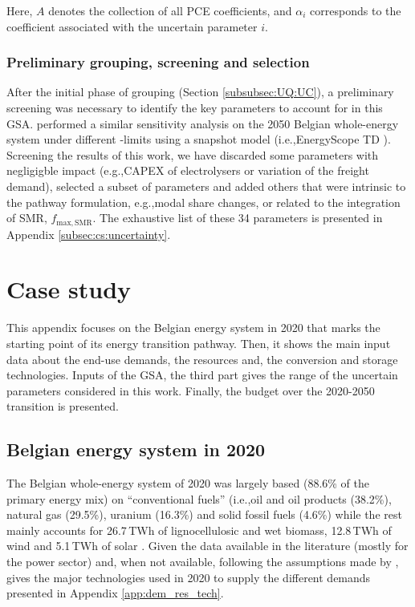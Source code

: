 \documentclass[11pt,twoside,a4paper,english]{article}
\def\eg{e.g.,}
\def\ie{i.e.,}
\begin{document}
\begin{appendices}
Here, $A$ denotes the collection of all PCE coefficients, and $\alpha_i$ corresponds to the coefficient associated with the uncertain parameter $i$.\par

\subsubsection{Preliminary grouping, screening and selection}
\label{subsubsec:UQ:screening}
After the initial phase of grouping (Section \ref{subsubsec:UQ:UC}), a preliminary screening was necessary to identify the key parameters to account for in this \gls{GSA}. \citet{rixhon2021role} performed a similar sensitivity analysis on the 2050 Belgian whole-energy system under different -limits using a snapshot model (\ie EnergyScope TD \cite{limpens2019energyscope}). Screening the results of this work, we have discarded some parameters with negligigble impact (\eg CAPEX of electrolysers or variation of the freight demand), selected a subset of parameters and added others that were intrinsic to the pathway formulation, \eg modal share changes, or related to the integration of \gls{SMR}, $f_{\mathrm{max,SMR}}$. The exhaustive list of these 34 parameters is presented in Appendix \ref{subsec:cs:uncertainty}.


\section{Case study}
\label{app:case_study}
This appendix focuses on the Belgian energy system in 2020 that marks the starting point of its energy transition pathway. Then, it shows the main input data about the end-use demands, the resources and, the conversion and storage technologies. Inputs of the \gls{GSA}, the third part gives the range of the uncertain parameters considered in this work. Finally, the  budget over the 2020-2050 transition is presented.


\subsection{Belgian energy system in 2020}
\label{app:bel_2020}
The Belgian whole-energy system of 2020 was largely based (88.6\% of the primary energy mix) on ``conventional fuels'' (\ie oil and oil products (38.2\%), natural gas (29.5\%), uranium (16.3\%) and solid fossil fuels (4.6\%) while the rest mainly accounts for 26.7\,TWh of lignocellulosic and wet biomass, 12.8\,TWh of wind and 5.1\,TWh of solar \cite{spf_economy_2022}. Given the data available in the literature (mostly for the power sector) and, when not available, following the assumptions made by \citet{Limpens2020},  gives the major technologies used in 2020 to supply the different demands presented in Appendix \ref{app:dem_res_tech}.


\end{appendices}
\end{document}
